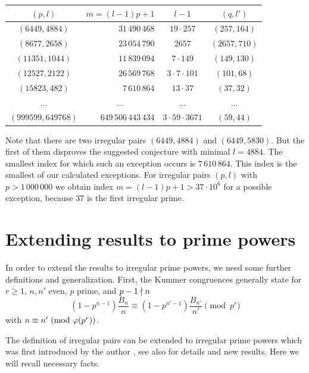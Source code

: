 \documentclass[12pt,english]{article}
\begin{document}
\begin{center}
\begin{tabular}{|c|r|c|c|} \hline
$(p,l)$ & $m= (l-1)p+1$ & $l-1$ & $(q,l')$ \\ \hline\hline
$(6449,4884)$  & $31\,490\,468$ & $19 \cdot 257$ & $(257,164)$ \\ \hline
$(8677,2658)$  & $23\,054\,790$ & $2657$         & $(2657,710)$ \\ \hline
$(11351,1044)$ & $11\,839\,094$ & $7 \cdot 149$  & $(149,130)$ \\ \hline
$(12527,2122)$ & $26\,569\,768$ & $3 \cdot 7 \cdot 101$ & $(101,68)$ \\ \hline
$(15823,482)$  & $7\,610\,864$  & $13 \cdot 37$ & $(37,32)$  \\ \hline
$\ldots$ & \multicolumn{1}{c|}{$\ldots$} & $\ldots$ & \multicolumn{1}{c|}{$\ldots$} \\ \hline
$(999599,649768)$ & $649\,506\,443\,434$ & $3 \cdot 59 \cdot 3671$ & $(59,44)$ \\ \hline
\end{tabular}
\end{center}
\medskip

Note that there are two irregular pairs $(6449,4884)$ and $(6449,5830)$. But the first of them
disproves the suggested conjecture with minimal $l=4884$. The smallest index for which such an
exception occurs is $7\,610\,864$. This index is the smallest
of our calculated exceptions. For irregular pairs $(p,l)$ with
$p > 1\,000\,000$ we obtain index $m = (l-1) p+1 > 37\cdot 10^6$ for a possible exception,
because $37$ is the first irregular prime.

\section{Extending results to prime powers}
\setcounter{equation}{0}

In order to extend the results to irregular prime powers,
we need some further definitions and generalization. First,
the Kummer congruences generally state
for $r \geq 1$, $n, n'$ even, $p$ prime, and $p-1 \nmid n$
\begin{equation} \label{eqn-kummer-congr-r}
   (1-p^{n-1}) \frac{B_n}{n} \equiv (1-p^{n'-1}) \frac{B_{n'}}{n'} \pmod{p^r}
\end{equation}
with $n \equiv n' \ \mod{\eulerphi(p^r)}$.
\medskip

The definition of irregular pairs can be extended to irregular prime powers
which was first introduced by the author \cite[Section 2.5]{kellner02irrpairord},
see also \cite{kellner04irrpowbn} for details and new results.
Here we will recall necessary facts.
\end{document}
